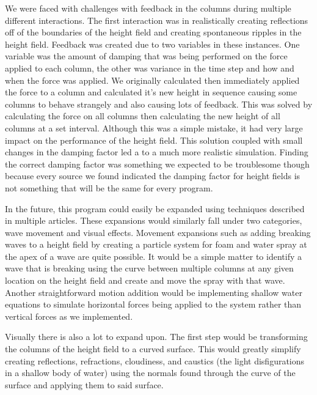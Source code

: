 \documentclass[11pt]{article}
\begin{document}
We were faced with challenges with feedback in the columns during multiple 
different interactions. The first interaction was in realistically creating 
reflections off of the boundaries of the height field and creating spontaneous 
ripples in the height field. Feedback was created due to two variables in these 
instances. One variable was the amount of damping that was being performed on 
the force applied to each column, the other was variance in the time step and 
how and when the force was applied. We originally calculated then immediately 
applied the force to a column and calculated it's new height in sequence 
causing some columns to behave strangely and also causing lots of feedback. 
This was solved by calculating the force on all columns then calculating the 
new height of all columns at a set interval. Although this was a simple 
mistake, it had very large impact on the performance of the height field. This 
solution coupled with small changes in the damping factor led a to a much more 
realistic simulation. Finding the correct damping factor was something we 
expected to be troublesome though because every source we found indicated the 
damping factor for height fields is not something that will be the same for 
every program.

In the future, this program could easily be expanded using techniques described 
in multiple articles. These expansions would similarly fall under two 
categories, wave movement and visual effects. Movement expansions such as 
adding breaking waves to a height field by creating a particle system for foam 
and water spray at the apex of a wave are quite possible. It would be a simple 
matter to identify a wave that is breaking using the curve between multiple 
columns at any given location on the height field and create and move the spray 
with that wave. Another straightforward motion addition would be implementing 
shallow water equations to simulate horizontal forces being applied to the 
system rather than vertical forces as we implemented.

Visually there is also a lot to expand upon. The first step would be 
transforming the columns of the height field to a curved surface. This would 
greatly simplify creating reflections, refractions, cloudiness, and caustics 
(the light disfigurations in a shallow body of water) using the normals found 
through the curve of the surface and applying them to said surface.

\nocite{*}
\printbibliography
\end{document}
